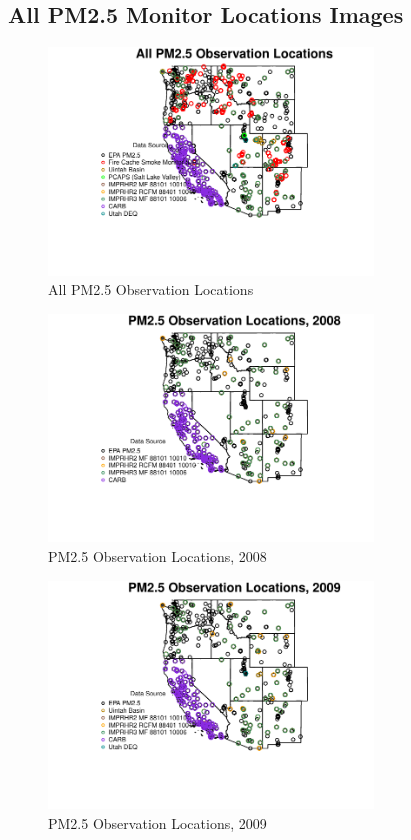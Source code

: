 
\subsection{All PM2.5 Monitor Locations Images} 
 

\begin{figure} 
\centering  
\includegraphics[width=0.77\textwidth]{Code_Outputs/MapPM25_All_SitesY0_ObsMapY0.pdf} 
\caption{\label{fig:MapPM25_All_SitesY0ObsMapY0}All PM2.5 Observation Locations} 
\end{figure} 
 

\begin{figure} 
\centering  
\includegraphics[width=0.77\textwidth]{Code_Outputs/MapPM25_All_SitesY2008_ObsMapY2008.pdf} 
\caption{\label{fig:MapPM25_All_SitesY2008ObsMapY2008}PM2.5 Observation Locations, 2008} 
\end{figure} 
 

\begin{figure} 
\centering  
\includegraphics[width=0.77\textwidth]{Code_Outputs/MapPM25_All_SitesY2009_ObsMapY2009.pdf} 
\caption{\label{fig:MapPM25_All_SitesY2009ObsMapY2009}PM2.5 Observation Locations, 2009} 
\end{figure} 
 

